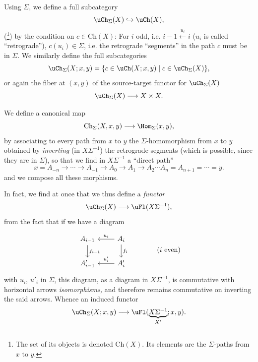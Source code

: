 Using $\Sigma$, we define a full subcategory
\[
\uCh_\Sigma(X)\hookrightarrow\uCh(X),
\]
(\footnote[3]{The set of its objects is denoted $\mathrm{Ch}(X)$. Its elements are the $\Sigma$-paths from $x$ to $y$.}) by the condition on $c\in\mathrm{Ch}(X)$: For $i$ odd, i.e. $i-1\xleftarrow{u_i}i$ ($u_i$ is called ``retrograde''), $c(u_i)\in\Sigma$, i.e. the retrograde ``segments'' in the path $c$ must be in $\Sigma$. We similarly define the full subcategories
\[
\uCh_\Sigma(X;x,y)=\{c\in\uCh(X;x,y)\mid c\in\uCh_\Sigma(X)\},
\]
or again the fiber at $(x,y)$ of the source-target functor for $\uCh_\Sigma(X)$
\[
\uCh_\Sigma(X)\longrightarrow X\times X.
\]

We define a canonical map
\[
\mathrm{Ch}_\Sigma(X,x,y)\longrightarrow\Hom_\Sigma(x,y),
\]
by associating to every path from $x$ to $y$ the $\Sigma$-homomorphism from $x$ to $y$ obtained by \textit{inverting} (in $X\Sigma^{-1}$) the retrograde segments (which is possible, since they are in $\Sigma$), so that we find in $X\Sigma^{-1}$ a ``direct path'' %
\[
x=A_{-n}\longrightarrow\cdots\longrightarrow A_{-1}\longrightarrow A_0\longrightarrow A_1\longrightarrow A_2\cdots A_n=A_{n+1}=\cdots=y.
\]
and we compose all these morphisms.

In fact, we find at once that we thus define a \textit{functor}
\[
\uCh_\Sigma(X)\longrightarrow\uFl(X\Sigma^{-1}),
\]
 from the fact that if we have a diagram

\[
\begin{tikzcd}
A_{i-1} \arrow[d, "f_{i-1}"] & A_i \arrow[l, "u_i"'] \arrow[d, "f_i"] \\
A'_{i-1} & A'_i \arrow[l, "u'_i"']
\end{tikzcd}
\qquad\qquad (i\text{ even})
\]
with $u_i$, $u'_i$ in $\Sigma$, this diagram, as a diagram in $X\Sigma^{-1}$, is commutative with horizontal arrows \textit{isomorphisms,} and therefore remains commutative on inverting the said arrows. Whence an induced functor
\[
\uCh_\Sigma(X;x,y)\longrightarrow\uFl(\underbrace{X\Sigma^{-1}}_{X'};x,y).
\]

